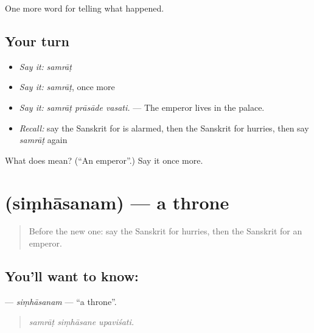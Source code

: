 \begin{grammarlens}[title={What you've built}]
One more word for telling what happened.
\end{grammarlens}

\subsection*{Your turn}
\begin{itemize}
\raggedright
  \item \emph{Say it:} \emph{samrāṭ}
  \item \emph{Say it:} \emph{samrāṭ}, once more
  \item \emph{Say it:} \emph{samrāṭ prāsāde vasati.} — The emperor lives in the palace.
  \item \emph{Recall:} say the Sanskrit for is alarmed, then the Sanskrit for hurries, then say \emph{samrāṭ} again
\end{itemize}

\begin{tcolorbox}[breakable,colback=teal!4,colframe=teal!35!black,title={Before you move on}]
What does  mean? (\textquotedblleft{}An emperor\textquotedblright{}.) Say it once more.
\end{tcolorbox}
\section[\texorpdfstring{\sk{सिंहासनम्} (siṃhāsanam)}{सिंहासनम् (siṃhāsanam)}]{ (siṃhāsanam) — a throne}

\label{lesson:SA-C316-simhasanam}



\begin{quote}
Before the new one: say the Sanskrit for hurries, then the Sanskrit for an emperor.
\end{quote}

\subsection*{You'll want to know: }
\textbf{} — \emph{siṃhāsanam} — \textquotedblleft{}a throne\textquotedblright{}.

\begin{quote}
  
\end{quote}

\begin{quote}
\emph{samrāṭ siṃhāsane upaviśati.}
\end{quote}

